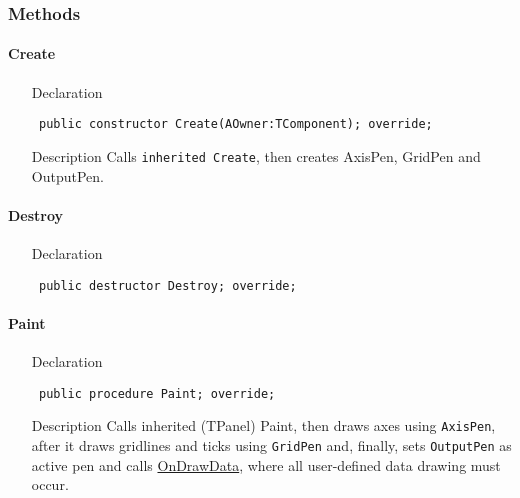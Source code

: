 \documentclass[12pt,a4paper,oneside]{report}
\newcommand{\declarationitem}[1]{{\addfontfeatures{FakeBold=1.3} #1}}
\newcommand{\descriptiontitle}[1]{{\addfontfeatures{FakeSlant}#1}}
\newcommand{\code}[1]{\texttt{#1}}
\begin{document}
\subsubsection{Methods}
\paragraph{Create}\hspace*{\fill}
\label{lmcoordsys.TCoordSys-Create}
\begin{itemize}\item[\declarationitem{Declaration}\hfill]
\begin{flushleft}
\code{
public constructor Create(AOwner:TComponent); override;}
\end{flushleft}
\item[\descriptiontitle{Description}] Calls \code{inherited Create}, then creates AxisPen, GridPen and OutputPen. 
\end{itemize}
\paragraph{Destroy}\hspace*{\fill}
\label{lmcoordsys.TCoordSys-Destroy}
\begin{itemize}\item[\declarationitem{Declaration}\hfill]
\begin{flushleft}
\code{
public destructor Destroy; override;}
\end{flushleft}
\end{itemize}
\paragraph{Paint}\hspace*{\fill}
\label{lmcoordsys.TCoordSys-Paint}
\begin{itemize}\item[\declarationitem{Declaration}\hfill]
\begin{flushleft}
\code{
public procedure Paint; override;}
\end{flushleft}
\item[\descriptiontitle{Description}] Calls inherited (TPanel) Paint, then draws axes using \code{AxisPen}, after it draws gridlines and ticks using \code{GridPen} and, finally, sets \code{OutputPen} as active pen and calls \hyperref[lmcoordsys.TCoordSys-OnDrawData]{OnDrawData}, where all user-defined data drawing must occur.
\end{itemize}
\end{document}
